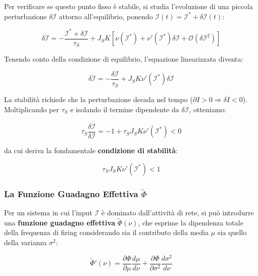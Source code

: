 Per verificare se questo punto fisso è stabile, si studia l'evoluzione di una piccola perturbazione $\delta\mathcal{I}$ attorno all'equilibrio, ponendo $\mathcal{I}(t) = \mathcal{I}^* + \delta\mathcal{I}(t)$:

\begin{equation}
\delta\dot{\mathcal{I}} = -\frac{\mathcal{I}^* + \delta\mathcal{I}}{\tau_S} + J_S K \left[\nu(\mathcal{I}^*) + \nu'(\mathcal{I}^*)\delta\mathcal{I} + \mathcal{O}(\delta\mathcal{I}^2)\right]
\end{equation}

Tenendo conto della condizione di equilibrio, l'equazione linearizzata diventa:

\begin{equation}
\delta\dot{\mathcal{I}} = -\frac{\delta\mathcal{I}}{\tau_S} + J_S K \nu'(\mathcal{I}^*) \delta\mathcal{I}
\end{equation}

La stabilità richiede che la perturbazione decada nel tempo ($\partial I > 0 \Rightarrow \delta\dot{I} < 0$). Moltiplicando per $\tau_S$ e isolando il termine dipendente da $\delta\mathcal{I}$, otteniamo:

\begin{equation}
\tau_S \frac{\delta\dot{\mathcal{I}}}{\delta\mathcal{I}} = -1 + \tau_S J_S K \nu'(\mathcal{I}^*) < 0
\end{equation}

da cui deriva la fondamentale \textbf{condizione di stabilità}:

\begin{equation}
\tau_S J_S K \nu'(\mathcal{I}^*) < 1
\end{equation}

\subsubsection{La Funzione Guadagno Effettiva $\tilde{\Phi}$}

Per un sistema in cui l'input $\mathcal{I}$ è dominato dall'attività di rete, si può introdurre una \textbf{funzione guadagno effettiva} $\tilde{\Phi}(\nu)$, che esprime la dipendenza totale della frequenza di firing considerando sia il contributo della media $\mu$ sia quello della varianza $\sigma^2$:

\begin{equation}
\tilde{\Phi}'(\nu) = \frac{\partial\Phi}{\partial\mu} \frac{d\mu}{d\nu} + \frac{\partial\Phi}{\partial\sigma^2} \frac{d\sigma^2}{d\nu}
\end{equation}

